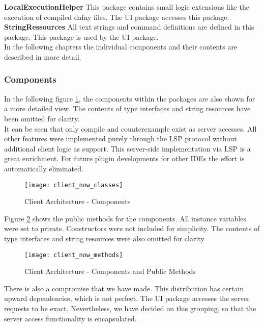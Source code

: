{\bf LocalExecutionHelper} \textendash{}
This package contains small logic extensions like the execution of compiled dafny files. The UI package accesses this package. \\

{\bf StringRessources} \textendash{}
All text strings and command definitions are defined in this package. This package is used by the UI package. \\

In the following chapters the individual components and their contents are described in more detail.

\subsubsection{Components}
In the following figure \ref{fig:client_now_classes}, the components within the packages are also shown for a more detailed view. The contents of type interfaces and string resources have been omitted for clarity. \\

It can be seen that only compile and counterexample exist as server accesses. All other features were implemented purely through the LSP protocol without additional client logic as support. This server-side implementation via LSP is a great enrichment. For future plugin developments for other IDEs the effort is automatically eliminated.

\begin{figure}[H]
    \centering
    \texttt{[image: client\_now\_classes]}
    \caption{Client Architecture - Components}
    \label{fig:client_now_classes}
\end{figure}


Figure \ref{fig:client_now_methods} shows the public methods for the components.
All instance variables were set to private. Constructors were not included for simplicity. The contents of type interfaces and string resources were also omitted for clarity

\begin{figure}[H]
    \centering
    \texttt{[image: client\_now\_methods]}
    \caption{Client Architecture - Components and Public Methods}
    \label{fig:client_now_methods}
\end{figure}

There is also a compromise that we have made.
This distribution has certain upward dependencies, which is not perfect.
The UI package accesses the server requests to be exact.
Nevertheless, we have decided on this grouping,
so that the server access functionality is encapsulated.
